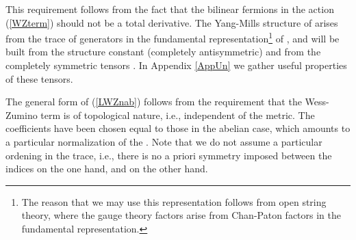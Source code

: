 \documentclass[12pt,a4paper]{article}
\begin{document}
This requirement follows from the fact that the bilinear fermions
in the action (\ref{WZterm}) should not be a total derivative. The Yang-Mills
structure of \coordHE{} arises from the trace of \coordHE{} generators
in the fundamental representation\footnote{The reason
that we may use this representation follows
from open string theory, where the gauge theory factors arise
from Chan-Paton factors in the fundamental representation.}
of \coordHE{}, and
will be built from the structure constant
\coordHE{} (completely antisymmetric) and from the completely
symmetric tensors \coordHE{}. In Appendix \ref{AppUn} we gather
useful properties of these tensors.


The general form of (\ref{LWZnab}) follows from the requirement that
the Wess-Zumino term is of topological nature, i.e., independent
of the metric. The coefficients have been chosen equal to those in the
abelian case, which amounts to a particular normalization of the
\coordHE{}. Note that we do not assume a particular ordening in
the trace, i.e., there is no a priori symmetry imposed between the indices
\coordHE{} on the one hand, and \coordHE{} on the other hand.
\end{document}
